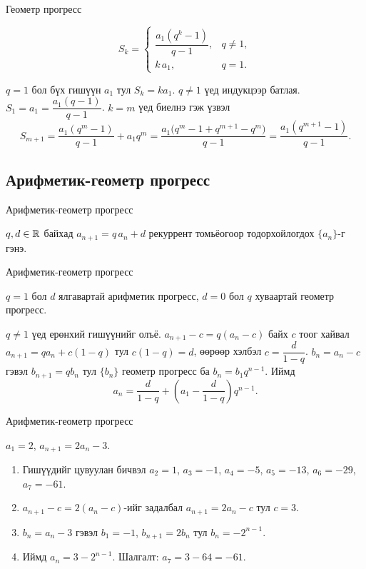 \begin{frame}[allowframebreaks]{Геометр прогресс}
\begin{theorem}
\[
S_k=
\begin{cases}
\dfrac{a_1(q^k-1)}{q-1}, & q\neq1,\\[6pt]
k\,a_1, & q=1.
\end{cases}
\]
\end{theorem}
\begin{prof}
$q=1$ бол бүх гишүүн $a_1$ тул $S_k=ka_1$. $q\neq1$ үед индукцээр батлая.
$S_1=a_1=\dfrac{a_1(q-1)}{q-1}$. $k=m$ үед биелнэ гэж үзвэл
\[
S_{m+1}=\frac{a_1(q^m-1)}{q-1}+a_1q^m=\frac{a_1\bigl(q^m-1+q^{m+1}-q^m\bigr)}{q-1}
=\frac{a_1(q^{m+1}-1)}{q-1}.
\]
\end{prof}
\end{frame}

\subsection{Арифметик-геометр прогресс}
\begin{frame}[allowframebreaks]{Арифметик-геометр прогресс}
\begin{definition}
$q,d\in\mathbb{R}$ байхад $a_{n+1}=q\,a_n+d$ рекуррент томьёогоор тодорхойлогдох $\{a_n\}$-г
 гэнэ.
\end{definition}
\end{frame}

\begin{frame}[allowframebreaks]{Арифметик-геометр прогресс}
\begin{remark}
$q=1$ бол $d$ ялгавартай арифметик прогресс, $d=0$ бол $q$ хуваартай геометр прогресс.
\end{remark}

$q\neq1$ үед ерөнхий гишүүнийг олъё. $a_{n+1}-c=q(a_n-c)$ байх $c$ тоог хайвал
$a_{n+1}=qa_n+c(1-q)$ тул $c(1-q)=d$, өөрөөр хэлбэл $c=\dfrac{d}{1-q}$.
$b_n=a_n-c$ гэвэл $b_{n+1}=qb_n$ тул $\{b_n\}$ геометр прогресс ба $b_n=b_1q^{n-1}$. Иймд
\[
\boxed{a_n=\frac{d}{1-q}+\left(a_1-\frac{d}{1-q}\right)q^{n-1}.}
\]
\end{frame}

\begin{frame}[allowframebreaks]{Арифметик-геометр прогресс}
\begin{example}
$a_1=2$, $a_{n+1}=2a_n-3$.
\begin{enumerate}
  \item Гишүүдийг цувуулан бичвэл $a_2=1$, $a_3=-1$, $a_4=-5$, $a_5=-13$, $a_6=-29$, $a_7=-61$.
  \item $a_{n+1}-c=2(a_n-c)$-ийг задалбал $a_{n+1}=2a_n-c$ тул $c=3$.
  \item $b_n=a_n-3$ гэвэл $b_1=-1$, $b_{n+1}=2b_n$ тул $b_n=-2^{n-1}$.
  \item Иймд $\boxed{a_n=3-2^{n-1}}$. \; Шалгалт: $a_7=3-64=-61$. \checkmark
\end{enumerate}
\end{example}
\end{frame}

